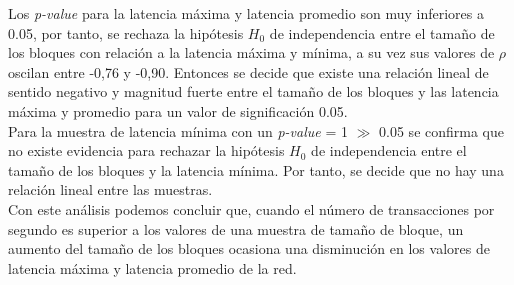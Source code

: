 \newpage

Los \emph{p-value} para la latencia m\'axima y latencia promedio son muy inferiores a 0.05, por tanto, se rechaza la hip\'otesis $H_0$ de independencia entre el tama\~no de los bloques con relaci\'on a la latencia m\'axima y m\'inima, a su vez sus valores de $\rho$ oscilan entre -0,76 y -0,90. Entonces se decide que existe una relaci\'on lineal de sentido negativo y magnitud fuerte entre el tama\~no de los bloques y las latencia m\'axima y promedio para un valor de significaci\'on 0.05.\\

Para la muestra de latencia m\'inima con un \emph{p-value} = 1 $\gg$ 0.05 se confirma que no existe evidencia para rechazar la hip\'otesis $H_0$ de independencia entre el tama\~no de los bloques y la latencia m\'inima. Por tanto, se decide que no hay una relaci\'on lineal entre las muestras.\\

Con este an\'alisis podemos concluir que, cuando el n\'umero de transacciones por segundo es superior a los valores de una muestra de tama\~no de bloque, un aumento del tama\~no de los bloques ocasiona una disminuci\'on en los valores de latencia m\'axima y latencia promedio de la red.\\


